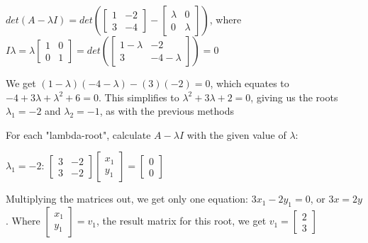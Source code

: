 \documentclass{article}
\begin{document}
\noindent $det(A - \lambda I) = det(\begin{bmatrix}
    1 & -2 \\
    3 & -4
\end{bmatrix} - \begin{bmatrix}
    \lambda & 0 \\
    0 & \lambda
    \end{bmatrix})$, where $I\lambda = \lambda \begin{bmatrix}
    1 & 0 \\
    0 & 1
    \end{bmatrix}
    =
    det(\begin{bmatrix}
   1 -  \lambda & -2 \\
    3 & -4 - \lambda
    \end{bmatrix})
    = 0$ \par
\noindent We get $(1 - \lambda)(-4 - \lambda) - (3)(-2) = 0$, which equates to $-4 + 3\lambda + \lambda ^{2} + 6 = 0$.  This simplifies to $\lambda ^{2} + 3\lambda + 2 = 0$, giving us the roots $\lambda_{1} = -2$ and $\lambda_{2} = -1$, as with the previous methods \par\vspace{0.25cm}

\noindent For each "lambda-root", calculate $A - \lambda I$ with the given value of $\lambda$: \par
\noindent $\lambda_{1} = -2$: 
$\begin{bmatrix}
    3 & -2 \\
    3 & -2
\end{bmatrix}
\begin{bmatrix}
    x_{1} \\
    y_{1}
\end{bmatrix}
=
\begin{bmatrix}
    0 \\
    0
\end{bmatrix}
$ \par
\noindent Multiplying the matrices out, we get only one equation: $3x_{1} - 2y_{1} = 0$, or $3x = 2y$.  Where $\begin{bmatrix}
    x_{1} \\
    y_{1}
\end{bmatrix} = v_{1}$, the result matrix for this root, we get $v_{1} = \begin{bmatrix}
    2 \\
    3
\end{bmatrix}$ \par\vspace{0.25cm}
\end{document}
